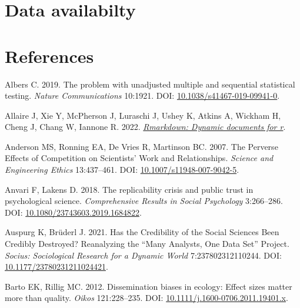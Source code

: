 \documentclass[10pt,a4paper]{article}
\newlength{\cslhangindent}
\newlength{\cslentryspacingunit} %
\newenvironment{CSLReferences}[2] %
 {%
  \setlength{\parindent}{0pt}
  \ifodd #1
  \let\oldpar\par
  \def\par{\hangindent=\cslhangindent\oldpar}
  \fi
  \setlength{\parskip}{#2\cslentryspacingunit}
 }%
 {}
\begin{document}
\hypertarget{data-availabilty}{%
\section{Data availabilty}\label{data-availabilty}}

\hypertarget{references}{%
\section*{References}\label{references}}

\hypertarget{refs}{}
\begin{CSLReferences}{1}{0}
\leavevmode{}%
Albers C. 2019. The problem with unadjusted multiple and sequential statistical testing. \emph{Nature Communications} 10:1921. DOI: \href{https://doi.org/10.1038/s41467-019-09941-0}{10.1038/s41467-019-09941-0}.

\leavevmode{}%
Allaire J, Xie Y, McPherson J, Luraschi J, Ushey K, Atkins A, Wickham H, Cheng J, Chang W, Iannone R. 2022. \emph{\href{https://github.com/rstudio/rmarkdown}{Rmarkdown: Dynamic documents for r}}.

\leavevmode{}%
Anderson MS, Ronning EA, De Vries R, Martinson BC. 2007. The {Perverse} {Effects} of {Competition} on {Scientists}' {Work} and {Relationships}. \emph{Science and Engineering Ethics} 13:437--461. DOI: \href{https://doi.org/10.1007/s11948-007-9042-5}{10.1007/s11948-007-9042-5}.

\leavevmode{}%
Anvari F, Lakens D. 2018. The replicability crisis and public trust in psychological science. \emph{Comprehensive Results in Social Psychology} 3:266--286. DOI: \href{https://doi.org/10.1080/23743603.2019.1684822}{10.1080/23743603.2019.1684822}.

\leavevmode{}%
Auspurg K, Brüderl J. 2021. Has the {Credibility} of the {Social} {Sciences} {Been} {Credibly} {Destroyed}? {Reanalyzing} the {``{Many} {Analysts}, {One} {Data} {Set}''} {Project}. \emph{Socius: Sociological Research for a Dynamic World} 7:237802312110244. DOI: \href{https://doi.org/10.1177/23780231211024421}{10.1177/23780231211024421}.

\leavevmode{}%
Barto EK, Rillig MC. 2012. Dissemination biases in ecology: Effect sizes matter more than quality. \emph{Oikos} 121:228--235. DOI: \href{https://doi.org/10.1111/j.1600-0706.2011.19401.x}{10.1111/j.1600-0706.2011.19401.x}.


\end{CSLReferences}
\end{document}
